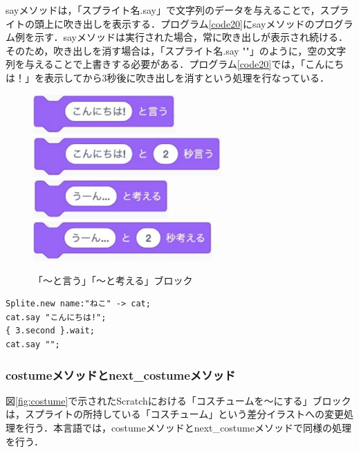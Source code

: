 \documentclass[10pt,a4j]{ltjsarticle}
\begin{document}
sayメソッドは，「スプライト名.say」で文字列のデータを与えることで，スプライトの頭上に吹き出しを表示する．プログラム\ref{code20}にsayメソッドのプログラム例を示す．sayメソッドは実行された場合，常に吹き出しが表示され続ける．そのため，吹き出しを消す場合は，「スプライト名.say ""」のように，空の文字列を与えることで上書きする必要がある．プログラム\ref{code20}では，「こんにちは！」を表示してから3秒後に吹き出しを消すという処理を行なっている．

\begin{figure}[H]
  \centering
  \includegraphics[height=15mm]{images/say.pdf} \\
  \includegraphics[height=15mm]{images/say_time.pdf} \\
  \includegraphics[height=15mm]{images/think.pdf} \\
  \includegraphics[height=15mm]{images/think_time.pdf} 
  \caption{「〜と言う」「〜と考える」ブロック}
  \label{fig:say}
\end{figure}

\begin{lstlisting}[caption=sayメソッドのプログラム例, label=code20]
Splite.new name:"ねこ" -> cat;
cat.say "こんにちは!";
{ 3.second }.wait;
cat.say "";
\end{lstlisting}

\subsubsection{costumeメソッドとnext\_costumeメソッド}
図\ref{fig:costume}で示されたScratchにおける「コスチュームを〜にする」ブロックは，スプライトの所持している「コスチューム」という差分イラストへの変更処理を行う．本言語では，costumeメソッドとnext\_costumeメソッドで同様の処理を行う．
\end{document}
